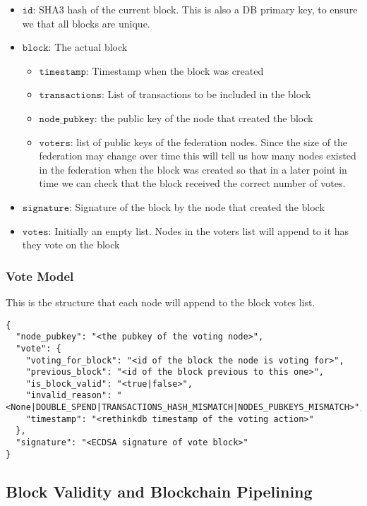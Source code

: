 \begin{itemize}
  \item $\mathtt{id}$: SHA3 hash of the current block. This is also a DB primary key, to ensure we that all blocks are unique. 
  \item $\mathtt{block}$: The actual block
    \begin{itemize}
      \item $\mathtt{timestamp}$: Timestamp when the block was created 
      \item $\mathtt{transactions}$: List of transactions to be included in the block 
      \item $\mathtt{node\_pubkey}$: the public key of the node that created the block 
      \item $\mathtt{voters}$: list of public keys of the federation nodes. Since the size of the federation may change over time this will tell us how many nodes existed in the federation when the block was created so that in a later point in time we can check that the block received the correct number of votes.
    \end{itemize}
  \item $\mathtt{signature}$: Signature of the block by the node that created the block
  \item $\mathtt{votes}$: Initially an empty list. Nodes in the voters list will append to it has they vote on the block
\end{itemize}

\subsubsection{Vote Model}
This is the structure that each node will append to the block votes list. 

\begin{lstlisting}[style=json]
{
  "node_pubkey": "<the pubkey of the voting node>",
  "vote": {
    "voting_for_block": "<id of the block the node is voting for>",
    "previous_block": "<id of the block previous to this one>", 
    "is_block_valid": "<true|false>", 
    "invalid_reason": "<None|DOUBLE_SPEND|TRANSACTIONS_HASH_MISMATCH|NODES_PUBKEYS_MISMATCH>", 
    "timestamp": "<rethinkdb timestamp of the voting action>" 
  },
  "signature": "<ECDSA signature of vote block>" 
}
\end{lstlisting}


\subsection{Block Validity and Blockchain Pipelining}

